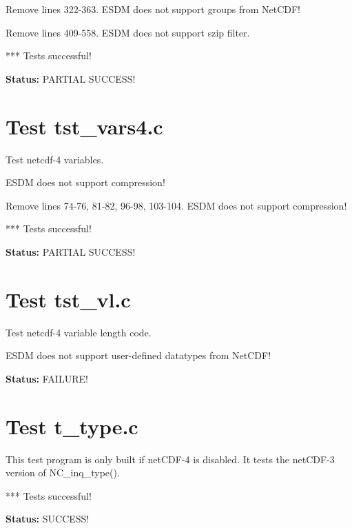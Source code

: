 Remove lines 322-363. ESDM does not support groups from NetCDF!

Remove lines 409-558. ESDM does not support szip filter.

*** Tests successful!

{\bf \large Status: } PARTIAL SUCCESS!

\section{Test tst\_vars4.c}

Test netcdf-4 variables.

ESDM does not support compression!

Remove lines 74-76, 81-82, 96-98, 103-104. ESDM does not support compression!

*** Tests successful!

{\bf \large Status: } PARTIAL SUCCESS!

\section{Test tst\_vl.c}

Test netcdf-4 variable length code.

ESDM does not support user-defined datatypes from NetCDF!

{\bf \large Status: } FAILURE!

\section{Test t\_type.c}

This test program is only built if netCDF-4 is disabled. It tests
   the netCDF-3 version of NC\_inq\_type().

*** Tests successful!

{\bf \large Status: } SUCCESS!
